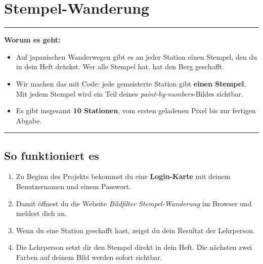 \renewcommand{\chaptertag}{Bildfilter}
\chapter{Stempel-Wanderung}


\vspace{-5pt}
{\color{maincolor}\rule{\textwidth}{0.4pt}}
\vspace{4pt}

{\color{maincolor}\textbf{Worum es geht:}}
\begin{itemize}[leftmargin=*]
  \item Auf japanischen Wanderwegen gibt es an jeder Station einen Stempel,
    den du in dein Heft dr\"uckst. Wer alle Stempel hat, hat den Berg geschafft.
  \item Wir machen das mit Code: jede gemeisterte Station gibt
    \textbf{einen Stempel}. Mit jedem Stempel wird ein Teil deines
    \textit{paint-by-numbers}-Bildes sichtbar.
  \item Es gibt insgesamt \textbf{10 Stationen}, vom ersten geladenen
    Pixel bis zur fertigen Abgabe.
\end{itemize}
\vspace{-2pt}
{\color{maincolor}\rule{\textwidth}{0.4pt}}
\vspace{8pt}

\section{So funktioniert es}

\begin{enumerate}
  \item Zu Beginn des Projekts bekommst du eine \textbf{Login-Karte} mit
    deinem Benutzernamen und einem Passwort.
  \item Damit \"offnest du die Website \textit{Bildfilter Stempel-Wanderung}
    im Browser und meldest dich an.
  \item Wenn du eine Station geschafft hast, zeigst du dein Resultat der
    Lehrperson.
  \item Die Lehrperson setzt dir den Stempel direkt in dein Heft. Die
    n\"achsten zwei Farben auf deinem Bild werden sofort sichtbar.
\end{enumerate}


